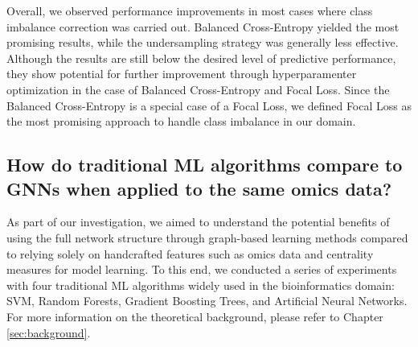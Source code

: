  Overall, we observed performance improvements in most cases where class imbalance correction was carried out. Balanced Cross-Entropy yielded the most promising results, while the undersampling strategy was generally less effective. Although the results are still below the desired level of predictive performance, they show potential for further improvement through hyperparamenter optimization in the case of Balanced Cross-Entropy and Focal Loss. Since the Balanced Cross-Entropy is a special case of a Focal Loss, we defined Focal Loss as the most promising approach to handle class imbalance in our domain. 


\subsection{How do traditional ML algorithms compare to GNNs when applied to the same omics data?}
\label{sec:results:comparative_evaluation:rq4}

As part of our investigation, we aimed to understand the potential benefits of using the full network structure through graph-based learning methods compared to relying solely on handcrafted features such as omics data and centrality measures for model learning. To this end, we conducted a series of experiments with four traditional ML algorithms widely used in the bioinformatics domain: SVM, Random Forests, Gradient Boosting Trees, and Artificial Neural Networks. For more information on the theoretical background, please refer to Chapter \ref{sec:background}.




